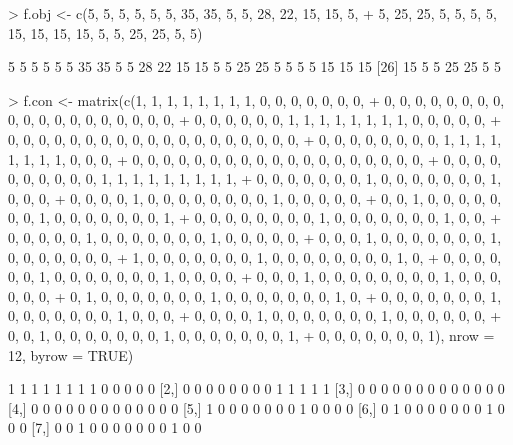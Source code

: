 \documentclass[a4paper,11pt]{scrartcl}
\begin{document}
\begin{Schunk}
\begin{Sinput}
> f.obj <- c(5, 5, 5, 5, 5, 5, 35, 35, 5, 5, 28, 22, 15, 15, 5, 
+     5, 25, 25, 5, 5, 5, 5, 15, 15, 15, 15, 5, 5, 25, 25, 5, 5)
\end{Sinput}
\begin{Soutput}
 [1]  5  5  5  5  5  5 35 35  5  5 28 22 15 15  5  5 25 25  5  5  5  5 15 15 15
[26] 15  5  5 25 25  5  5
\end{Soutput}
\begin{Sinput}
> f.con <- matrix(c(1, 1, 1, 1, 1, 1, 1, 1, 0, 0, 0, 0, 0, 0, 0, 
+     0, 0, 0, 0, 0, 0, 0, 0, 0, 0, 0, 0, 0, 0, 0, 0, 0, 0, 0, 
+     0, 0, 0, 0, 0, 0, 1, 1, 1, 1, 1, 1, 1, 1, 0, 0, 0, 0, 0, 
+     0, 0, 0, 0, 0, 0, 0, 0, 0, 0, 0, 0, 0, 0, 0, 0, 0, 0, 0, 
+     0, 0, 0, 0, 0, 0, 0, 0, 1, 1, 1, 1, 1, 1, 1, 1, 0, 0, 0, 
+     0, 0, 0, 0, 0, 0, 0, 0, 0, 0, 0, 0, 0, 0, 0, 0, 0, 0, 0, 
+     0, 0, 0, 0, 0, 0, 0, 0, 0, 0, 1, 1, 1, 1, 1, 1, 1, 1, 1, 
+     0, 0, 0, 0, 0, 0, 0, 1, 0, 0, 0, 0, 0, 0, 0, 1, 0, 0, 0, 
+     0, 0, 0, 0, 1, 0, 0, 0, 0, 0, 0, 0, 0, 1, 0, 0, 0, 0, 0, 
+     0, 0, 1, 0, 0, 0, 0, 0, 0, 0, 1, 0, 0, 0, 0, 0, 0, 0, 1, 
+     0, 0, 0, 0, 0, 0, 0, 0, 1, 0, 0, 0, 0, 0, 0, 0, 1, 0, 0, 
+     0, 0, 0, 0, 0, 1, 0, 0, 0, 0, 0, 0, 0, 1, 0, 0, 0, 0, 0, 
+     0, 0, 0, 1, 0, 0, 0, 0, 0, 0, 0, 1, 0, 0, 0, 0, 0, 0, 0, 
+     1, 0, 0, 0, 0, 0, 0, 0, 1, 0, 0, 0, 0, 0, 0, 0, 0, 1, 0, 
+     0, 0, 0, 0, 0, 0, 1, 0, 0, 0, 0, 0, 0, 0, 1, 0, 0, 0, 0, 
+     0, 0, 0, 1, 0, 0, 0, 0, 0, 0, 0, 0, 1, 0, 0, 0, 0, 0, 0, 
+     0, 1, 0, 0, 0, 0, 0, 0, 0, 1, 0, 0, 0, 0, 0, 0, 0, 1, 0, 
+     0, 0, 0, 0, 0, 0, 0, 1, 0, 0, 0, 0, 0, 0, 0, 1, 0, 0, 0, 
+     0, 0, 0, 0, 1, 0, 0, 0, 0, 0, 0, 0, 1, 0, 0, 0, 0, 0, 0, 
+     0, 0, 1, 0, 0, 0, 0, 0, 0, 0, 1, 0, 0, 0, 0, 0, 0, 0, 1, 
+     0, 0, 0, 0, 0, 0, 0, 1), nrow = 12, byrow = TRUE)
\end{Sinput}
\begin{Soutput}
      [,1] [,2] [,3] [,4] [,5] [,6] [,7] [,8] [,9] [,10] [,11] [,12] [,13]
 [1,]    1    1    1    1    1    1    1    1    0     0     0     0     0
 [2,]    0    0    0    0    0    0    0    0    1     1     1     1     1
 [3,]    0    0    0    0    0    0    0    0    0     0     0     0     0
 [4,]    0    0    0    0    0    0    0    0    0     0     0     0     0
 [5,]    1    0    0    0    0    0    0    0    1     0     0     0     0
 [6,]    0    1    0    0    0    0    0    0    0     1     0     0     0
 [7,]    0    0    1    0    0    0    0    0    0     0     1     0     0

\end{Soutput}
\end{Schunk}
\end{document}

